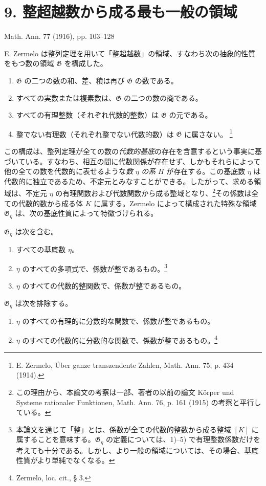 \section*{9. 整超越数から成る最も一般の領域}
\begin{center}
Math. Ann. 77 (1916), pp. 103--128
\end{center}

E. Zermelo は整列定理を用いて「整超越数」の領域、すなわち次の抽象的性質をもつ数の領域 $\mathfrak G$ を構成した。
\begin{enumerate}
\item[I.] $\mathfrak G$ の二つの数の和、差、積は再び $\mathfrak G$ の数である。
\item[II.] すべての実数または複素数は、$\mathfrak G$ の二つの数の商である。
\item[III.] すべての有理整数（それぞれ代数的整数）は $\mathfrak G$ の元である。
\item[IV.] 整でない有理数（それぞれ整でない代数的数）は $\mathfrak G$ に属さない。
\footnote{E. Zermelo, Über ganze transzendente Zahlen, Math. Ann. 75, p. 434 (1914).}
\end{enumerate}

この構成は、整列定理が全ての数の\emph{代数的基底}の存在を含意するという事実に基づいている。すなわち、相互の間に代数関係が存在せず、しかもそれらによって他の全ての数を代数的に表せるような\emph{数} $\eta$ \emph{の系} $H$ が存在する。この基底数 $\eta$ は代数的に独立であるため、不定元とみなすことができる。したがって、求める領域は、不定元 $\eta$ の有理関数および代数関数から成る整域となり、\footnote{この理由から、本論文の考察は一部、著者の以前の論文 Körper und Systeme rationaler Funktionen, Math. Ann. 76, p. 161 (1915) の考察と平行している。}その係数は全ての代数的数から成る体 $K$ に属する。Zermelo によって構成された特殊な領域 $\mathfrak G_\eta$ は、次の基底性質によって特徴づけられる。

$\mathfrak G_\eta$ は次を含む。
\begin{enumerate}
\item[1)] すべての基底数 $\eta$。
\item[2)] $\eta$ のすべての多項式で、係数が整であるもの。\footnote{本論文を通じて「整」とは、係数が全ての代数的整数から成る整域 $[K]$ に属することを意味する。$\mathfrak G_\eta$ の定義については、1)--5) で有理整数係数だけを考えても十分である。しかし、より一般の領域については、その場合、基底性質がより単純でなくなる。}
\item[3)] $\eta$ のすべての代数的整関数で、係数が整であるもの。
\end{enumerate}
$\mathfrak G_\eta$ は次を排除する。
\begin{enumerate}
\item[4)] $\eta$ のすべての有理的に分数的な関数で、係数が整であるもの。
\item[5)] $\eta$ のすべての代数的に分数的な関数で、係数が整であるもの。\footnote{Zermelo, loc. cit., § 3.}
\end{enumerate}

